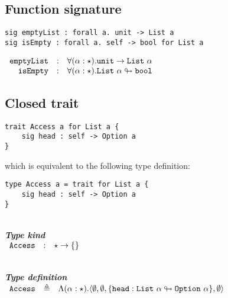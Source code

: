 \documentclass{article}[11pt]
\newcommand{\subsubsubsection}[1]
{
    ~\\
    {\bf {\em #1}} \\
}
\newcommand{\term}[1]{\verb~#1~}
\begin{document}
    \subsection{Function signature}\label{subsec:function-signature}

    \begin{verbatim}
sig emptyList : forall a. unit -> List a
sig isEmpty : forall a. self -> bool for List a
    \end{verbatim}

    \noindent
    \begin{math}
        \begin{array}{rclp{5cm}}
            \term{emptyList} & : & \forall(\alpha:\star).\term{unit} \rightarrow \term{List}~\alpha     \\
            \term{isEmpty}   & : & \forall(\alpha:\star).\term{List}~\alpha \looparrowright \term{bool}
        \end{array}
    \end{math}

    \subsection{Closed trait}\label{subsec:closed-trait}

    \begin{verbatim}
trait Access a for List a {
    sig head : self -> Option a
}
    \end{verbatim}

    which is equivalent to the following type definition:

    \begin{verbatim}
type Access a = trait for List a {
    sig head : self -> Option a
}
    \end{verbatim}

    \subsubsubsection{Type kind}

    \noindent
    \begin{math}
        \begin{array}{rclp{5cm}}
            \term{Access}  & : & \star \rightarrow  \{\}
        \end{array}
    \end{math}

    \subsubsubsection{Type definition}

    \noindent
    \begin{math}
        \begin{array}{rclp{5cm}}
            \term{Access} & \triangleq & \Lambda(\alpha:\star).\langle
            \emptyset,
            \emptyset,
            \{ \term{head} : \term{List}~\alpha \looparrowright \term{Option}~\alpha \},
            \emptyset
            \rangle
        \end{array}
    \end{math}
\end{document}
